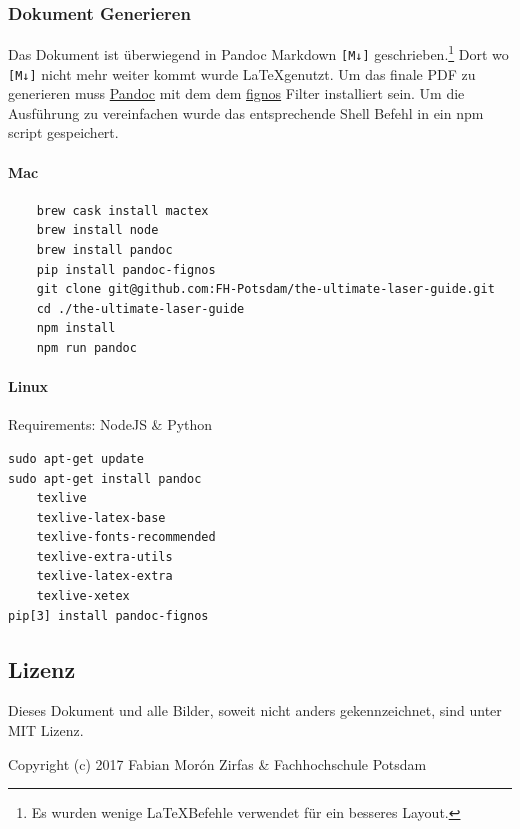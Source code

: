 \documentclass[]{article}
\let\oldparagraph\paragraph
\renewcommand{\paragraph}[1]{\oldparagraph{#1}\mbox{}}
\begin{document}
\hypertarget{dokument-generieren}{%
\subsubsection{Dokument Generieren}\label{dokument-generieren}}

Das Dokument ist überwiegend in Pandoc Markdown \texttt{{[}M↓{]}}
geschrieben.\footnote{Es wurden wenige \LaTeX  Befehle verwendet für ein
  besseres Layout.} Dort wo \texttt{{[}M↓{]}} nicht mehr weiter kommt
wurde \LaTeX genutzt. Um das finale PDF zu generieren muss
\href{https://pandoc.org/}{Pandoc} mit dem dem
\href{https://github.com/tomduck/pandoc-fignos}{fignos} Filter
installiert sein. Um die Ausführung zu vereinfachen wurde das
entsprechende Shell Befehl in ein npm script gespeichert.

\hypertarget{mac}{%
\paragraph{Mac}\label{mac}}

\begin{verbatim}
    brew cask install mactex
    brew install node
    brew install pandoc
    pip install pandoc-fignos
    git clone git@github.com:FH-Potsdam/the-ultimate-laser-guide.git
    cd ./the-ultimate-laser-guide
    npm install
    npm run pandoc
\end{verbatim}

\hypertarget{linux}{%
\paragraph{Linux}\label{linux}}

Requirements: NodeJS \& Python

\begin{verbatim}
sudo apt-get update
sudo apt-get install pandoc
    texlive
    texlive-latex-base
    texlive-fonts-recommended
    texlive-extra-utils
    texlive-latex-extra
    texlive-xetex
pip[3] install pandoc-fignos
\end{verbatim}

\hypertarget{lizenz}{%
\subsection{Lizenz}\label{lizenz}}

Dieses Dokument und alle Bilder, soweit nicht anders gekennzeichnet,
sind unter MIT Lizenz.

Copyright (c) 2017 Fabian Morón Zirfas \& Fachhochschule Potsdam
\end{document}
